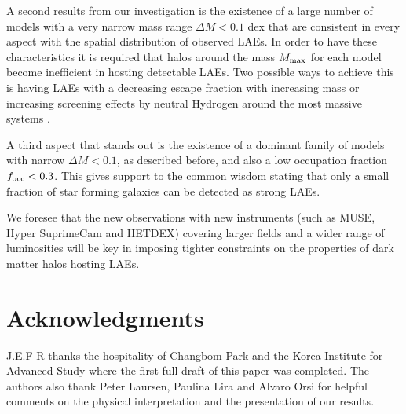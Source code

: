 \documentclass[usenatbib]{mn2e}
\newcommand{\ly}{{\ifmmode{{\rm Ly}\alpha}\else{Ly$\alpha$~}\fi}}
\begin{document}
 
A second results from our investigation is the existence
of a large number of models with a very narrow mass range $\Delta M<
0.1$ dex that are consistent in every aspect with the spatial
distribution of observed LAEs. In order to have these characteristics
it is required that halos around the mass $M_{\rm   max}$ for each
model become inefficient in hosting detectable LAEs. Two possible
ways to achieve this is having LAEs with a decreasing \ly escape
fraction with increasing mass or increasing screening effects by
neutral Hydrogen around the most massive systems
\citep{Laursen2009,ForeroRomero2011}.   

A third aspect that stands out is the existence of a dominant family
of models with narrow $\Delta M<0.1$, as described before, and also a
low occupation fraction $f_{\rm occ}<0.3$. This gives support to the
common wisdom stating that only a small fraction of star forming
galaxies can be detected as strong LAEs. 

We foresee that the new observations with new instruments (such as MUSE,
Hyper SuprimeCam and HETDEX) covering larger fields and a wider range
of luminosities will be key in imposing tighter constraints on the
properties of dark matter halos hosting LAEs.  


\section*{Acknowledgments} 
J.E.F-R thanks the hospitality of Changbom Park and the Korea
Institute for Advanced Study where the first full draft of this paper
was completed. The authors also thank Peter Laursen, Paulina Lira and
Alvaro Orsi for helpful comments on the physical interpretation and
the presentation of our results. 
\end{document}
